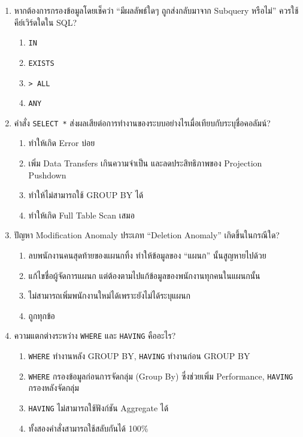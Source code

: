 \documentclass[a4paper,12pt]{article}
\begin{document}
\begin{enumerate}[label=\textbf{\arabic*.}]
    \item หากต้องการกรองข้อมูลโดยเช็คว่า ``มีผลลัพธ์ใดๆ ถูกส่งกลับมาจาก Subquery หรือไม่'' ควรใช้คีย์เวิร์ดใดใน SQL?
    \begin{enumerate}[label=\alph*.]
        \item \texttt{IN}
        \item \texttt{EXISTS}
        \item \texttt{> ALL}
        \item \texttt{ANY}
    \end{enumerate}

    \item คำสั่ง \texttt{SELECT *} ส่งผลเสียต่อการทำงานของระบบอย่างไรเมื่อเทียบกับระบุชื่อคอลัมน์?
    \begin{enumerate}[label=\alph*.]
        \item ทำให้เกิด Error บ่อย
        \item เพิ่ม Data Transfers เกินความจำเป็น และลดประสิทธิภาพของ Projection Pushdown
        \item ทำให้ไม่สามารถใช้ GROUP BY ได้
        \item ทำให้เกิด Full Table Scan เสมอ
    \end{enumerate}

    \item ปัญหา Modification Anomaly ประเภท ``Deletion Anomaly'' เกิดขึ้นในกรณีใด?
    \begin{enumerate}[label=\alph*.]
        \item ลบพนักงานคนสุดท้ายของแผนกทิ้ง ทำให้ข้อมูลของ ``แผนก'' นั้นสูญหายไปด้วย
        \item แก้ไขชื่อผู้จัดการแผนก แต่ต้องตามไปแก้ข้อมูลของพนักงานทุกคนในแผนกนั้น
        \item ไม่สามารถเพิ่มพนักงานใหม่ได้เพราะยังไม่ได้ระบุแผนก
        \item ถูกทุกข้อ
    \end{enumerate}

    \item ความแตกต่างระหว่าง \texttt{WHERE} และ \texttt{HAVING} คืออะไร?
    \begin{enumerate}[label=\alph*.]
        \item \texttt{WHERE} ทำงานหลัง GROUP BY, \texttt{HAVING} ทำงานก่อน GROUP BY
        \item \texttt{WHERE} กรองข้อมูลก่อนการจัดกลุ่ม (Group By) ซึ่งช่วยเพิ่ม Performance, \texttt{HAVING} กรองหลังจัดกลุ่ม
        \item \texttt{HAVING} ไม่สามารถใช้ฟังก์ชัน Aggregate ได้
        \item ทั้งสองคำสั่งสามารถใช้สลับกันได้ 100\%
    \end{enumerate}


\end{enumerate}
\end{document}
